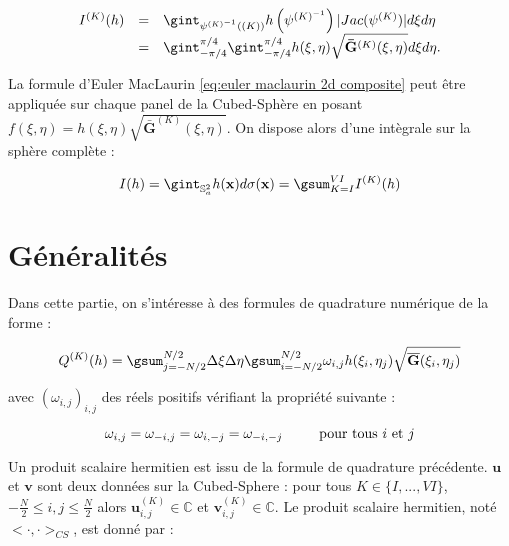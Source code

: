 \begin{equation}
\begin{array}{rcl}
I^{(K)}(h) & = &  \gint_{\psi^{(K)^{-1}}\left((K)\right)}  h\left( \psi^{(K)^{-1}}\right) |Jac ( \psi^{(K)} )|d\xi d\eta \\
& = & \gint_{-\pi/4}^{\pi/4}\gint_{-\pi/4}^{\pi/4} h(\xi, \eta) \sqrt{\mathbf{\bar{G}}^{(K)}(\xi, \eta)} d \xi d \eta.
\end{array}
\end{equation}

La formule d'Euler MacLaurin \eqref{eq:euler maclaurin 2d composite} peut être appliquée sur chaque panel de la Cubed-Sphère en posant $f(\xi,\eta)=h(\xi,\eta)\sqrt{\mathbf{\bar{G}}^{(K)}(\xi, \eta)}$. On dispose alors d'une intègrale sur la sphère complète :

\begin{equation}
I(h)=\gint_{\mathbb{S}_a^2} h(\mathbf{x})d\sigma(\mathbf{x}) = \gsum_{K = I}^{VI} I^{(K)}(h)
\end{equation}














\section{Généralités}

Dans cette partie, on s'intéresse à des formules de quadrature numérique de la forme :

\begin{equation}
Q^{(K)}(h)= \gsum_{j=-N/2}^{N/2} \Delta \xi \Delta \eta \gsum_{i=-N/2}^{N/2} \omega_{i,j} h(\xi_i,\eta_j) \sqrt{\overline{\mathbf{G}}(\xi_i,\eta_j)}
\label{eq: quadrature generale}
\end{equation}

avec $(\omega_{i,j})_{i,j}$ des réels positifs vérifiant la propriété suivante :

\begin{equation}
\omega_{i,j}=\omega_{-i,j}=\omega_{i,-j}=\omega_{-i,-j} \hspace{0.8cm} \text{ pour tous } i \text{ et } j
\label{hyp: prop triangulaire}
\end{equation}

Un produit scalaire hermitien est issu de la formule de quadrature précédente. $\mathbf{u}$ et $\mathbf{v}$ sont deux données sur la Cubed-Sphere : pour tous $K \in \lbrace I, ..., VI \rbrace$, $-\frac{N}{2} \leq i,j \leq \frac{N}{2}$ alors $\mathbf{u}_{i,j}^{(K)} \in \mathbb{C}$ et $\mathbf{v}_{i,j}^{(K)} \in \mathbb{C}$. Le produit scalaire hermitien, noté $< \cdot, \cdot >_{CS}$, est donné par :

